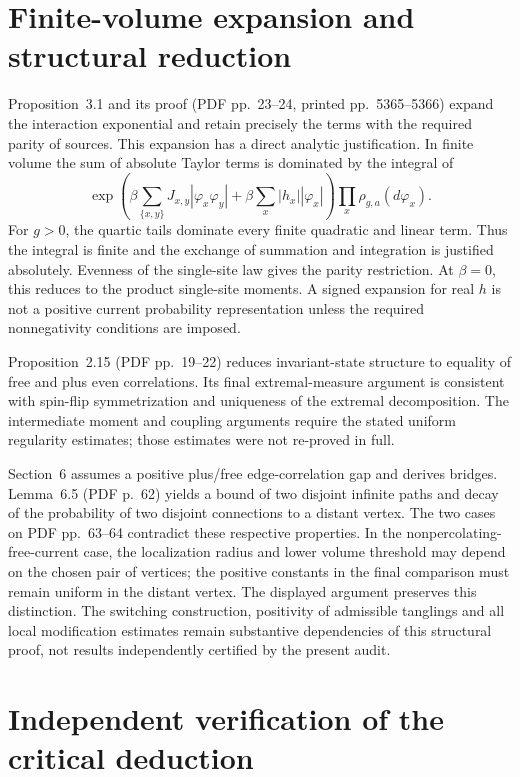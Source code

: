 \documentclass[10pt]{article}
\begin{document}
\section*{Finite-volume expansion and structural reduction}
Proposition 3.1 and its proof (PDF pp. 23–24, printed pp. 5365–5366) expand the interaction exponential and retain precisely the terms with the required parity of sources. This expansion has a direct analytic justification. In finite volume the sum of absolute Taylor terms is dominated by the integral of \[\exp\!\left(\beta\sum_{\{x,y\}}J_{x,y}|\varphi_x\varphi_y|
       +\beta\sum_x|h_x||\varphi_x|\right)
 \prod_x \rho_{g,a}(d\varphi_x).\] For \(g>0\), the quartic tails dominate every finite quadratic and linear term. Thus the integral is finite and the exchange of summation and integration is justified absolutely. Evenness of the single-site law gives the parity restriction. At \(\beta=0\), this reduces to the product single-site moments. A signed expansion for real \(h\) is not a positive current probability representation unless the required nonnegativity conditions are imposed.\par
Proposition 2.15 (PDF pp. 19–22) reduces invariant-state structure to equality of free and plus even correlations. Its final extremal-measure argument is consistent with spin-flip symmetrization and uniqueness of the extremal decomposition. The intermediate moment and coupling arguments require the stated uniform regularity estimates; those estimates were not re-proved in full.\par
Section 6 assumes a positive plus/free edge-correlation gap and derives bridges. Lemma 6.5 (PDF p. 62) yields a bound of two disjoint infinite paths and decay of the probability of two disjoint connections to a distant vertex. The two cases on PDF pp. 63–64 contradict these respective properties. In the nonpercolating-free-current case, the localization radius and lower volume threshold may depend on the chosen pair of vertices; the positive constants in the final comparison must remain uniform in the distant vertex. The displayed argument preserves this distinction. The switching construction, positivity of admissible tanglings and all local modification estimates remain substantive dependencies of this structural proof, not results independently certified by the present audit.\par
\section*{Independent verification of the critical deduction}
\end{document}
